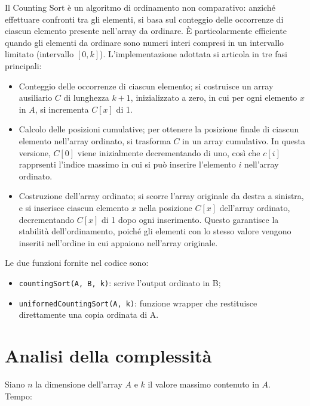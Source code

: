 \documentclass[a4paper, 12pt, oneside]{book}
\begin{document}
Il Counting Sort è un algoritmo di ordinamento non comparativo: anziché effettuare confronti tra gli elementi, si basa sul conteggio delle occorrenze di ciascun elemento presente nell'array da ordinare.
È particolarmente efficiente quando gli elementi da ordinare sono numeri interi compresi in un intervallo limitato (intervallo \([0, k]\)).
L'implementazione adottata si articola in tre fasi principali:

\begin{itemize}
    \item Conteggio delle occorrenze di ciascun elemento; si costruisce un array ausiliario \(C\) di lunghezza \(k+1\), inizializzato a zero, in cui per ogni elemento \(x\) in \(A\), si incrementa \(C[x]\) di 1.
    \item Calcolo delle posizioni cumulative; per ottenere la posizione finale di ciascun elemento nell'array ordinato, si trasforma \(C\) in un array cumulativo. In questa versione, \(C[0]\) viene inizialmente decrementando di uno, così che \(c[i]\) rapprsenti l'indice massimo in cui si può inserire l'elemento \(i\) nell'array ordinato.
    \item Costruzione dell'array ordinato; si scorre l'array originale da destra a sinistra, e si inserisce ciascun elemento \(x\) nella posizione \(C[x]\) dell'array ordinato, decrementando \(C[x]\) di 1 dopo ogni inserimento. Questo garantisce la stabilità dell'ordinamento, poiché gli elementi con lo stesso valore vengono inseriti nell'ordine in cui appaiono nell'array originale.
\end{itemize}

\noindent Le due funzioni fornite nel codice sono:

\begin{itemize}
    \item \texttt{countingSort(A, B, k)}: scrive l'output ordinato in B;
    \item \texttt{uniformedCountingSort(A, k)}: funzione wrapper che restituisce direttamente una copia ordinata di A.
\end{itemize}

\section{Analisi della complessità}

Siano \(n\) la dimensione dell'array \(A\) e \(k\) il valore massimo contenuto in \(A\). \\

\noindent Tempo:
\end{document}
